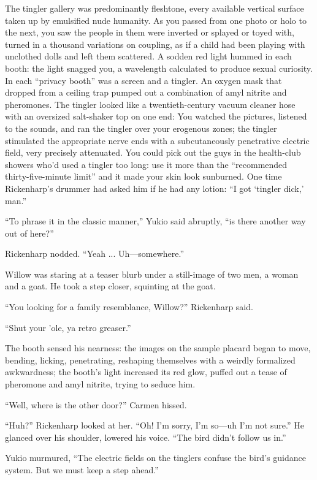 The tingler gallery was predominantly fleshtone, every available vertical surface taken up by emulsified nude humanity. As you passed from one photo or holo to the next, you saw the people in them were inverted or splayed or toyed with, turned in a thousand variations on coupling, as if a child had been playing with unclothed dolls and left them scattered. A sodden red light hummed in each booth: the light snagged you, a wavelength calculated to produce sexual curiosity. In each ``privacy booth'' was a screen and a tingler. An oxygen mask that dropped from a ceiling trap pumped out a combination of amyl nitrite and pheromones. The tingler looked like a twentieth-century vacuum cleaner hose with an oversized salt-shaker top on one end: You watched the pictures, listened to the sounds, and ran the tingler over your erogenous zones; the tingler stimulated the appropriate nerve ends with a subcutaneously penetrative electric field, very precisely attenuated. You could pick out the guys in the health-club showers who'd used a tingler too long: use it more than the ``recommended thirty-five-minute limit'' and it made your skin look sunburned. One time Rickenharp's drummer had asked him if he had any lotion: ``I got ‘tingler dick,' man.''

``To phrase it in the classic manner,'' Yukio said abruptly, ``is there another way out of here?''

Rickenharp nodded. ``Yeah ... Uh—somewhere.''

Willow was staring at a teaser blurb under a still-image of two men, a woman and a goat. He took a step closer, squinting at the goat.

``You looking for a family resemblance, Willow?'' Rickenharp said.

``Shut your 'ole, ya retro greaser.''

The booth sensed his nearness: the images on the sample placard began to move, bending, licking, penetrating, reshaping themselves with a weirdly formalized awkwardness; the booth's light increased its red glow, puffed out a tease of pheromone and amyl nitrite, trying to seduce him.

``Well, where is the other door?'' Carmen hissed.

``Huh?'' Rickenharp looked at her. ``Oh! I'm sorry, I'm so—uh I'm not sure.'' He glanced over his shoulder, lowered his voice. ``The bird didn't follow us in.''

Yukio murmured, ``The electric fields on the tinglers confuse the bird's guidance system. But we must keep a step ahead.''

